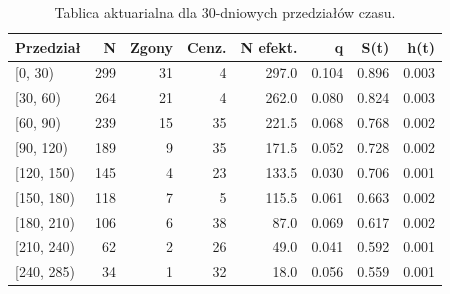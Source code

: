 \begin{table}[htbp]
\centering
\caption{Tablica aktuarialna dla 30-dniowych przedziałów czasu.}
\label{tab:life}
\scriptsize
\setlength{\tabcolsep}{2.4pt}
\begin{tabular*}{.98\linewidth}{@{\extracolsep{\fill}}lrrrrrrr}
\toprule
Przedział & N & Zgony & Cenz. & N efekt. & q & S(t) & h(t) \\
\midrule
{[0, 30)} & 299 & 31 & 4 & 297.0 & 0.104 & 0.896 & 0.003 \\
{[30, 60)} & 264 & 21 & 4 & 262.0 & 0.080 & 0.824 & 0.003 \\
{[60, 90)} & 239 & 15 & 35 & 221.5 & 0.068 & 0.768 & 0.002 \\
{[90, 120)} & 189 & 9 & 35 & 171.5 & 0.052 & 0.728 & 0.002 \\
{[120, 150)} & 145 & 4 & 23 & 133.5 & 0.030 & 0.706 & 0.001 \\
{[150, 180)} & 118 & 7 & 5 & 115.5 & 0.061 & 0.663 & 0.002 \\
{[180, 210)} & 106 & 6 & 38 & 87.0 & 0.069 & 0.617 & 0.002 \\
{[210, 240)} & 62 & 2 & 26 & 49.0 & 0.041 & 0.592 & 0.001 \\
{[240, 285)} & 34 & 1 & 32 & 18.0 & 0.056 & 0.559 & 0.001 \\
\bottomrule
\end{tabular*}
\end{table}
